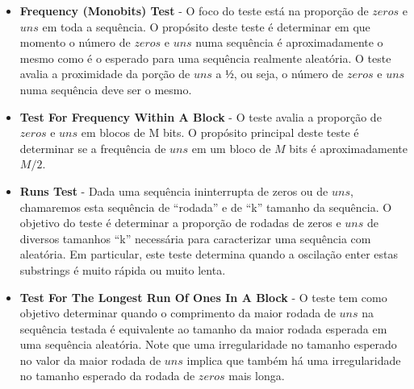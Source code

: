   \begin{itemize}
   \item \textbf{Frequency (Monobits) Test} - O foco do teste está na proporção de $zeros$ e $uns$ em toda a sequência. O propósito deste teste é determinar em que momento o número de $zeros$ e $uns$ numa sequência é aproximadamente o mesmo como é o esperado para uma sequência realmente aleatória. O teste avalia a proximidade da porção de $uns$ a $½$, ou seja, o número de $zeros$ e $uns$ numa sequência deve ser o mesmo.
   \item \textbf{Test For Frequency Within A Block} - O teste avalia a proporção de $zeros$ e $uns$ em blocos de M bits. O propósito principal deste teste é determinar se a frequência de $uns$ em um bloco de $M$ bits é aproximadamente $M/2$.
   \item \textbf{Runs Test} -  Dada uma sequência ininterrupta de zeros ou de $uns$, chamaremos esta sequência de ``rodada'' e de ``k'' tamanho da sequência. O objetivo do teste é determinar a proporção de rodadas de zeros e $uns$ de diversos tamanhos ``k'' necessária para caracterizar uma sequência com aleatória. Em particular, este teste determina quando a oscilação enter estas substrings é muito rápida ou muito lenta.
   \item \textbf{Test For The Longest Run Of Ones In A Block} - O teste tem como objetivo determinar quando o comprimento da maior rodada de $uns$ na sequência testada é equivalente ao tamanho da maior rodada esperada em uma sequência aleatória. Note que uma irregularidade no tamanho esperado no valor da maior rodada de $uns$ implica que também há uma irregularidade no tamanho esperado da rodada de $zeros$ mais longa.

\end{itemize}
